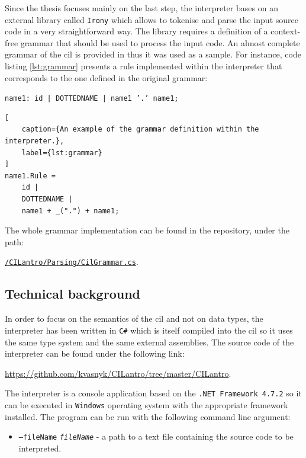 \documentclass{article}
\numberwithin{equation}{section}
\begin{document}
Since the thesis focuses mainly on the last step, the interpreter bases on an external library called \texttt{Irony} which allows to tokenise and parse the input source code in a very straightforward way. The library requires a definition of a context-free grammar that should be used to process the input code. An almost complete grammar of the \acrshort{cil} is provided in \cite{ecmaStandard} thus it was used as a sample. For instance, code listing \ref{lst:grammar} presents a rule implemented within the interpreter that corresponds to the one defined in the original grammar:
\begin{center}
\texttt{name1: id
| DOTTEDNAME
| name1 '.' name1;}
\end{center}
\begin{lstlisting}[
	caption={An example of the grammar definition within the interpreter.},
	label={lst:grammar}
]
name1.Rule =
	id |
	DOTTEDNAME |
	name1 + _(".") + name1;
\end{lstlisting}
The whole grammar implementation can be found in the repository, under the path:
\begin{center}
	\href{https://github.com/kvasnyk/CILantro/blob/master/CILantro/CILantro/Parsing/CilGrammar.cs}{\texttt{/CILantro/Parsing/CilGrammar.cs}}.
\end{center}

\subsection{Technical background}

In order to focus on the semantics of the \acrshort{cil} and not on data types, the interpreter has been written in \texttt{C\#} which is itself compiled into the \acrshort{cil} so it uses the same type system and the same external assemblies. The source code of the interpreter can be found under the following link:

\begin{center}
	\href{https://github.com/kvasnyk/CILantro/tree/master/CILantro}{https://github.com/kvasnyk/CILantro/tree/master/CILantro}.
\end{center}

The interpreter is a console application based on the \texttt{.NET Framework 4.7.2} so it can be executed in \texttt{Windows} operating system with the appropriate framework installed. The program can be run with the following command line argument:
\begin{itemize}
	\item{\texttt{--fileName} \texttt{\textit{fileName}} - a path to a text file containing the source code to be interpreted.}
\end{itemize}
\end{document}
